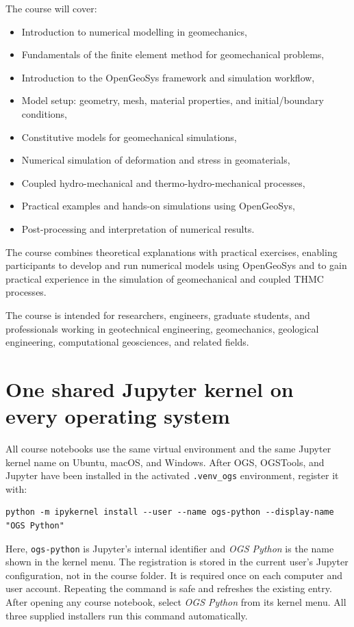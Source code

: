\documentclass[11pt,a4paper]{tubaf-report}
\begin{document}
\noindent
The course will cover:
\begin{itemize}
    \item Introduction to numerical modelling in geomechanics,
    \item Fundamentals of the finite element method for geomechanical problems,
    \item Introduction to the OpenGeoSys framework and simulation workflow,
    \item Model setup: geometry, mesh, material properties, and initial/boundary conditions,
    \item Constitutive models for geomechanical simulations,
    \item Numerical simulation of deformation and stress in geomaterials,
    \item Coupled hydro-mechanical and thermo-hydro-mechanical processes,
    \item Practical examples and hands-on simulations using OpenGeoSys,
    \item Post-processing and interpretation of numerical results.
\end{itemize}

The course combines theoretical explanations with practical exercises, enabling participants to develop and run numerical models using OpenGeoSys and to gain practical experience in the simulation of geomechanical and coupled THMC processes.


The course is intended for researchers, engineers, graduate students, and professionals working in geotechnical engineering, geomechanics, geological engineering, computational geosciences, and related fields.

\section{One shared Jupyter kernel on every operating system}

All course notebooks use the same virtual environment and the same Jupyter
kernel name on Ubuntu, macOS, and Windows. After OGS, OGSTools, and Jupyter have
been installed in the activated \texttt{.venv\_ogs} environment, register it
with:

\begin{lstlisting}[style=terminal]
python -m ipykernel install --user --name ogs-python --display-name "OGS Python"
\end{lstlisting}

Here, \texttt{ogs-python} is Jupyter's internal identifier and
\emph{OGS Python} is the name shown in the kernel menu. The registration is
stored in the current user's Jupyter configuration, not in the course folder.
It is required once on each computer and user account. Repeating the command is
safe and refreshes the existing entry. After opening any course notebook,
select \emph{OGS Python} from its kernel menu. All three supplied installers
run this command automatically.
\end{document}
